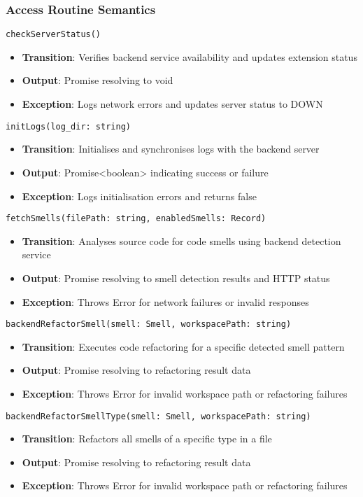 \documentclass[12pt, titlepage]{article}
\begin{document}
\subsubsection{Access Routine Semantics}

\noindent\texttt{checkServerStatus()}
\begin{itemize}
    \item \textbf{Transition}: Verifies backend service availability and updates extension status
    \item \textbf{Output}: Promise resolving to void
    \item \textbf{Exception}: Logs network errors and updates server status to DOWN
\end{itemize}

\noindent\texttt{initLogs(log\_dir: string)}
\begin{itemize}
    \item \textbf{Transition}: Initialises and synchronises logs with the backend server
    \item \textbf{Output}: Promise<boolean> indicating success or failure
    \item \textbf{Exception}: Logs initialisation errors and returns false
\end{itemize}

\noindent\texttt{fetchSmells(filePath: string, enabledSmells: Record)}
\begin{itemize}
    \item \textbf{Transition}: Analyses source code for code smells using backend detection service
    \item \textbf{Output}: Promise resolving to smell detection results and HTTP status
    \item \textbf{Exception}: Throws Error for network failures or invalid responses
\end{itemize}

\noindent\texttt{backendRefactorSmell(smell: Smell, workspacePath: string)}
\begin{itemize}
    \item \textbf{Transition}: Executes code refactoring for a specific detected smell pattern
    \item \textbf{Output}: Promise resolving to refactoring result data
    \item \textbf{Exception}: Throws Error for invalid workspace path or refactoring failures
\end{itemize}

\noindent\texttt{backendRefactorSmellType(smell: Smell, workspacePath: string)}
\begin{itemize}
    \item \textbf{Transition}: Refactors all smells of a specific type in a file
    \item \textbf{Output}: Promise resolving to refactoring result data
    \item \textbf{Exception}: Throws Error for invalid workspace path or refactoring failures
\end{itemize}
\end{document}
